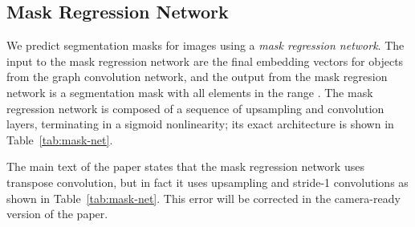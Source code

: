 \documentclass[10pt,twocolumn,letterpaper]{article}
\begin{document}
\subsection{Mask Regression Network}
We predict segmentation masks for images using a \emph{mask regression network}.
The input to the mask regression network are the final embedding vectors for objects from the
graph convolution network, and the output from the mask regresion network is a 
segmentation mask with all elements in the range . The mask regression network is composed
of a sequence of upsampling and convolution layers, terminating in a sigmoid nonlinearity; its exact
architecture is shown in Table~\ref{tab:mask-net}.

The main text of the paper states that the mask regression network uses transpose convolution, but
in fact it uses upsampling and stride-1 convolutions as shown in Table~\ref{tab:mask-net}. This error
will be corrected in the camera-ready version of the paper.
\end{document}
